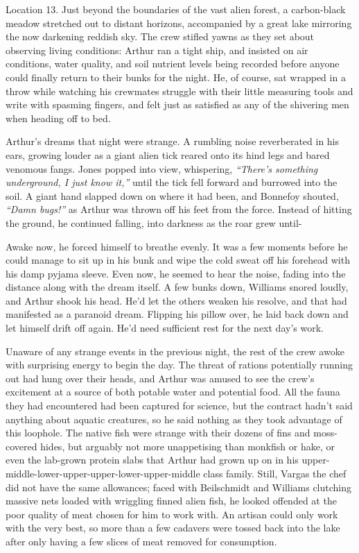 Location 13. Just beyond the boundaries of the vast alien forest, a carbon-black meadow stretched out to distant horizons, accompanied by a great lake mirroring the now darkening reddish sky. The crew stifled yawns as they set about observing living conditions: Arthur ran a tight ship, and insisted on air conditions, water quality, and soil nutrient levels being recorded before anyone could finally return to their bunks for the night. He, of course, sat wrapped in a throw while watching his crewmates struggle with their little measuring tools and write with spasming fingers, and felt just as satisfied as any of the shivering men when heading off to bed. 

Arthur’s dreams that night were strange. A rumbling noise reverberated in his ears, growing louder as a giant alien tick reared onto its hind legs and bared venomous fangs. Jones popped into view, whispering, \textit{“There’s something underground, I just know it,”} until the tick fell forward and burrowed into the soil. A giant hand slapped down on where it had been, and Bonnefoy shouted, \textit{“Damn bugs!”} as Arthur was thrown off his feet from the force. Instead of hitting the ground, he continued falling, into darkness as the roar grew until- 

Awake now, he forced himself to breathe evenly. It was a few moments before he could manage to sit up in his bunk and wipe the cold sweat off his forehead with his damp pyjama sleeve. Even now, he seemed to hear the noise, fading into the distance along with the dream itself. A few bunks down, Williams snored loudly, and Arthur shook his head. He’d let the others weaken his resolve, and that had manifested as a paranoid dream. Flipping his pillow over, he laid back down and let himself drift off again. He’d need sufficient rest for the next day’s work. 

Unaware of any strange events in the previous night, the rest of the crew awoke with surprising energy to begin the day. The threat of rations potentially running out had hung over their heads, and Arthur was amused to see the crew’s excitement at a source of both potable water and potential food. All the fauna they had encountered had been captured for science, but the contract hadn’t said anything about aquatic creatures, so he said nothing as they took advantage of this loophole. The native fish were strange with their dozens of fins and moss-covered hides, but arguably not more unappetising than monkfish or hake, or even the lab-grown protein slabs that Arthur had grown up on in his upper-middle-lower-upper-upper-lower-upper-middle class family. Still, Vargas the chef did not have the same allowances; faced with Beilschmidt and Williams clutching massive nets loaded with wriggling finned alien fish, he looked offended at the poor quality of meat chosen for him to work with. An artisan could only work with the very best, so more than a few cadavers were tossed back into the lake after only having a few slices of meat removed for consumption. 

